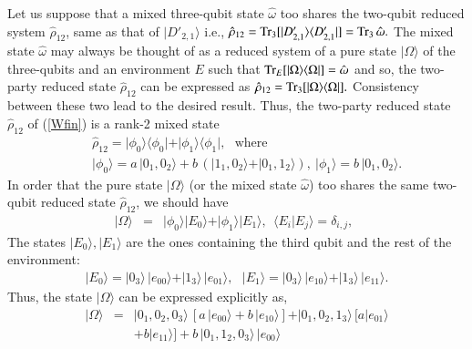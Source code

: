 {Let us suppose that a mixed  three-qubit state $\hat\omega$ too shares the  two-qubit reduced system $\hat{\rho}_{12}$, 
same as that of $\vert D'_{2,1}\rangle$ i.e., $\hat{\rho}_{12}={\rm Tr}_{3}[\vert D_{2,1}'\rangle\langle 
D_{2,1}'\vert]={\rm Tr}_{3}\,\hat{\omega}.$  The mixed state $\hat{\omega}$ may always be thought of as a reduced system of a 
pure state  $\vert\Omega\rangle$ of the three-qubits and an environment $E$ such that ${\rm 
Tr}_{E}[\vert\Omega\rangle\langle \Omega\vert]=\hat\omega$ and so, the two-party reduced state $\hat{\rho}_{12}$ can be 
expressed  as  $\hat{\rho}_{12}={\rm Tr}_{3}[\vert \Omega\rangle\langle \Omega\vert].$
Consistency between these two lead to the desired result. Thus, the two-party reduced  state $\hat{\rho}_{12}$ of %
(\ref{Wfin}) is a rank-2 mixed state 
\begin{eqnarray}
\label{wp2}
&&\hat{\rho}_{12}=\vert \phi_0\rangle\langle \phi_0\vert + 
\vert \phi_1\rangle\langle \phi_1\vert, \ \ \ \mbox{where} \\ 
& & \vert \phi_0\rangle= a\, \vert 0_1,0_2\rangle + b\, (\vert 1_1, 0_2\rangle
 +\vert 0_1,1_2\rangle),\  
   \vert \phi_1\rangle= b\, \vert 0_1,0_2\rangle. \nonumber
\end{eqnarray}
In order that the  pure state $\vert\Omega\rangle$ (or the mixed state $\hat\omega$) too shares the same 
two-qubit reduced state $\hat{\rho}_{12}$, we should have 
\begin{eqnarray}
\label{wp3}
\vert\Omega\rangle&=&\vert \phi_0\rangle\vert E_0\rangle +\vert \phi_1\rangle\vert E_1\rangle, \ \  
\langle E_i\vert E_j\rangle=\delta_{i,j},\ \ 
\end{eqnarray}     
The states $\vert E_{0}\rangle, \vert E_{1}\rangle$ are the ones containing the third qubit and the rest of the %
environment:    
\begin{eqnarray*}   
\vert E_0\rangle=\vert 0_3\rangle\,  \vert e_{00}\rangle+\vert 1_3\rangle\,  \vert e_{01}\rangle,\ \ \ 
 \vert E_1\rangle=\vert 0_3\rangle\,  \vert e_{10}\rangle+\vert 1_3\rangle\,  \vert e_{11}\rangle.   
\end{eqnarray*}
Thus, the state $\vert \Omega\rangle$ can be expressed explicitly as, %
\begin{eqnarray}
\label{omega}
\vert \Omega\rangle&=& \vert 0_1,0_2,0_3\rangle\, [a\,\vert e_{00}\rangle+b\, \vert e_{10}\rangle] 
+ \vert 
0_1,0_2,1_3\rangle\, [a\vert e_{01}\rangle\nonumber \\
&&+b\vert e_{11}\rangle]+ b\,  \vert 0_1,1_2,0_3\rangle\,\vert e_{00}\rangle  

\end{eqnarray}}

